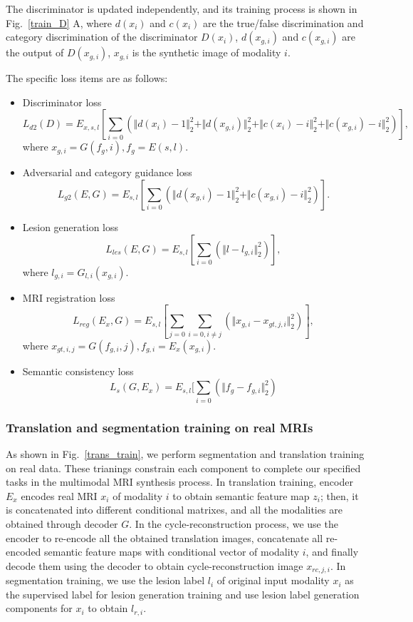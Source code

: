 \documentclass[runningheads]{llncs}
\begin{document}
The discriminator is updated independently, and its training process is shown in Fig.~\ref{train_D} A, 
where $d(x_{i})$ and $c(x_{i})$ are the true/false discrimination and category discrimination of the discriminator $D(x_i)$, $d(x_{g, i})$ and $c(x_{g,i})$ are the output of $D(x_{g,i})$, $x_{g,i}$ is the synthetic image of modality $i$. 

The specific loss items are as follows:
\begin{itemize}
	\item{Discriminator loss }
	\begin{equation}
	L_{d2}(D)=E_{x,s,l}[\sum\limits_{i=0}(\Vert{d(x_i)-1}\Vert_{2}^{2}+\Vert{d(x_{g,i})}\Vert_{2}^{2}+
	\Vert{c(x_i)-i}\Vert_{2}^{2}+\Vert{c(x_{g,i})-i}\Vert_{2}^{2})],
	\end{equation}
	where $x_{g,i}=G(f_g,i),f_g=E(s,l)$.
	\item{Adversarial and category guidance loss}
	\begin{equation}
	L_{g2}(E,G)=E_{s,l}[\sum\limits_{i=0}(\Vert{d(x_{g,i})-1}\Vert_{2}^{2}+\Vert{c(x_{g,i})-i}\Vert_{2}^{2})].
	\end{equation}
	\item{Lesion generation loss}
	\begin{equation}
	L_{les}(E,G)=E_{s,l}[\sum\limits_{i=0}(\Vert{l-l_{g,i}}\Vert_{2}^{2})],
	\end{equation}
	where $l_{g,i}=G_{l,i}(x_{g,i})$.
	\item{MRI registration loss}
	\begin{equation}
	L_{reg}(E_x,G)=E_{s,l}[\sum\limits_{j=0}\sum\limits_{i=0,i\neq j}(\Vert{x_{g,i}-x_{gt,j,i}}\Vert_{2}^{2})],
	\end{equation}
	where $x_{gt,i,j}=G(f_{g,i},j),f_{g,i}=E_x(x_{g,i})$.
	\item{Semantic consistency loss}
	\begin{equation}
	L_{s}(G,E_x)=E_{s,l}[\sum\limits_{i=0}(\Vert{f_g-f_{g,i}}\Vert_{2}^{2})
	\end{equation}	
\end{itemize}

\subsubsection{Translation and segmentation training on real MRIs}
As shown in Fig.~\ref{trans_train}, we perform segmentation and translation training on real data. These trianings constrain each component to complete our specified tasks in the multimodal MRI synthesis process.
In translation training, encoder $E_x$ encodes real MRI $x_i$ of modality $i$ to obtain semantic feature map $z_{i}$; then, it is concatenated into different conditional matrixes, and all the modalities are obtained through decoder $G$. In the cycle-reconstruction process, we use the encoder to re-encode all the obtained translation images, concatenate all re-encoded semantic feature maps with conditional vector of modality $i$, and finally decode them using the decoder to obtain cycle-reconstruction image $x_{rc,j,i}$. In segmentation training, we use the lesion label $l_i$ of original input modality $x_i$ as the supervised label for lesion generation training and use lesion label generation components for $x_i$ to obtain $l_{r,i}$. 
\end{document}
